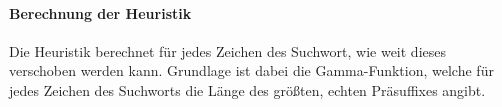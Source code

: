 \paragraph{Berechnung der Heuristik}
Die Heuristik berechnet für jedes Zeichen des Suchwort, wie weit dieses verschoben werden kann. Grundlage ist dabei die Gamma-Funktion, welche für jedes Zeichen des Suchworts die Länge des größten, echten Präsuffixes angibt.

\begin{algorithm}[H]
	\caption{$\gamma$}

	\BlankLine

	\BlankLine

\end{algorithm}
